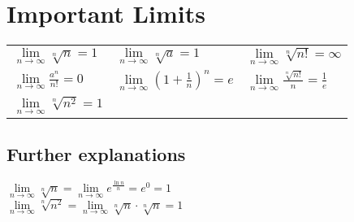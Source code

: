 \section*{Important Limits}

\begin{tabular}{p{.333\linewidth}p{.333\linewidth}p{.333\linewidth}}
    $\lim\limits_{n\to\infty} \sqrt[n]{n} = 1$ &
    $\lim\limits_{n\to\infty} \sqrt[n]{a} = 1$ &
    $\lim\limits_{n\to\infty} \sqrt[n]{n!} = \infty$ \\
    $\lim\limits_{n\to\infty} \frac{a^n}{n!} = 0$ &
    $\lim\limits_{n\to\infty} \left(1+\frac{1}{n}\right)^n = e$ &
    $\lim\limits_{n\to\infty} \frac{\sqrt[n]{n!}}{n} = \frac{1}{e}$ \\
    $\lim\limits_{n\to\infty} \sqrt[n]{n^2} = 1$ &
    &
    \\
\end{tabular}

\subsection*{Further explanations}
$\lim\limits_{n\to\infty} \sqrt[n]{n} = \lim\limits_{n\to\infty} e^{\frac{\ln{n}}{n}} = e^0 = 1$\\
$\lim\limits_{n\to\infty} \sqrt[n]{n^2} = \lim\limits_{n\to\infty} \sqrt[n]{n} \cdot \sqrt[n]{n} = 1$

